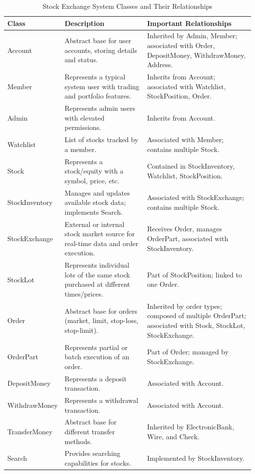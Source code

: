 \begin{table}[h!]
\centering
\begin{tabularx}{\textwidth}{|X|X|X|}
\hline
\textbf{Class} & \textbf{Description} & \textbf{Important Relationships} \\
\hline
Account & Abstract base for user accounts, storing details and status. & Inherited by Admin, Member; associated with Order, DepositMoney, WithdrawMoney, Address. \\
\hline
Member & Represents a typical system user with trading and portfolio features. & Inherits from Account; associated with Watchlist, StockPosition, Order. \\
\hline
Admin & Represents admin users with elevated permissions. & Inherits from Account. \\
\hline
Watchlist & List of stocks tracked by a member. & Associated with Member; contains multiple Stock. \\
\hline
Stock & Represents a stock/equity with a symbol, price, etc. & Contained in StockInventory, Watchlist, StockPosition. \\
\hline
StockInventory & Manages and updates available stock data; implements Search. & Associated with StockExchange; contains multiple Stock. \\
\hline
StockExchange & External or internal stock market source for real-time data and order execution. & Receives Order, manages OrderPart, associated with StockInventory. \\
\hline
StockLot & Represents individual lots of the same stock purchased at different times/prices. & Part of StockPosition; linked to one Order. \\
\hline
Order & Abstract base for orders (market, limit, stop-loss, stop-limit). & Inherited by order types; composed of multiple OrderPart; associated with Stock, StockLot, StockExchange. \\
\hline
OrderPart & Represents partial or batch execution of an order. & Part of Order; managed by StockExchange. \\
\hline
DepositMoney & Represents a deposit transaction. & Associated with Account. \\
\hline
WithdrawMoney & Represents a withdrawal transaction. & Associated with Account. \\
\hline
TransferMoney & Abstract base for different transfer methods. & Inherited by ElectronicBank, Wire, and Check. \\
\hline
Search & Provides searching capabilities for stocks. & Implemented by StockInventory. \\
\hline
\end{tabularx}
\caption{Stock Exchange System Classes and Their Relationships}
\label{tab:stock_exchange_classes}
\end{table}

